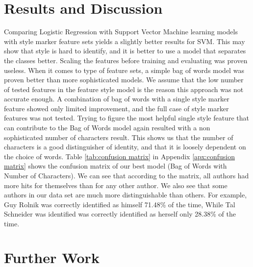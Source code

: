\documentclass[a4paper]{article}
\begin{document}
\section{Results and Discussion}
\label{Results}

Comparing Logistic Regression with Support Vector Machine learning models with style marker feature sets yields a slightly better results for SVM.
This may show that style is hard to identify, and it is better to use a model that separates the classes better.
Scaling the features before training and evaluating was proven useless.
When it comes to type of feature sets, a simple bag of words model was proven better than more sophisticated models. We assume that the low number of tested features in the feature style model is the reason this approach was not accurate enough. A combination of bag of words with a single style marker feature showed only limited improvement, and the full case of style marker features was not tested.
Trying to figure the most helpful single style feature that can contribute to the Bag of Words model again resulted with a non sophisticated number of characters result. This shows us that the number of characters is a good distinguisher of identity, and that it is loosely dependent on the choice of words.
Table \ref{tab:confusion matrix} in Appendix \ref{apx:confusion matrix} shows the confusion matrix of our best model (Bag of Words with Number of Characters).
We can see that according to the matrix, all authors had more hits for themselves than for any other author.
We also see that some authors in our data set are much more distinguishable than others. For example, Guy Rolnik was correctly identified as himself 71.48\% of the time, While Tal Schneider was identified was correctly identified as herself only 28.38\% of the time.


\section{Further Work}
\label{Further Work}
\end{document}
